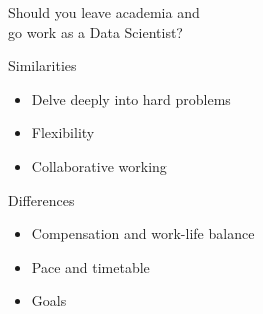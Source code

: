 

\subtitle{Planning your Data Science career}



\maketitle

\begin{frame}
    \begin{center}
        \LARGE%
        Should you leave academia and \\
        go work as a Data Scientist?
    \end{center}
\end{frame}

\begin{frame}{Similarities}
    \large%
    \begin{itemize}
        \setlength{\itemsep}{\medskipamount}
        \item Delve deeply into hard problems
        \item Flexibility
        \item Collaborative working
    \end{itemize}
\end{frame}

\begin{frame}{Differences}
    \large%
    \begin{itemize}
        \setlength{\itemsep}{\medskipamount}
        \item Compensation and work\hyp{}life balance
        \item Pace and timetable
        \item Goals
    \end{itemize}
\end{frame}

\begin{frame}
\end{frame}

